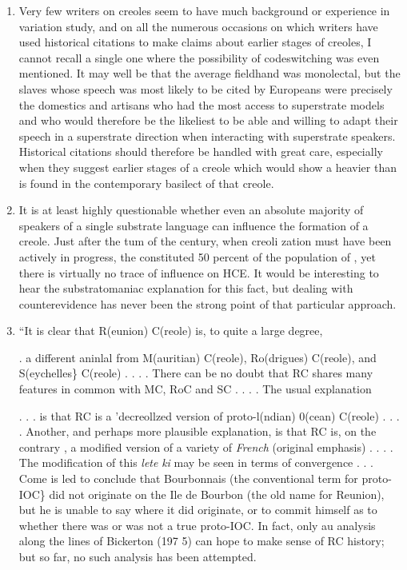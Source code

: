 \begin{enumerate} 
\item Very few writers on creoles seem to have much background or experience in variation study, and on all the numerous occasions on which writers have used historical citations to make claims about earlier stages of creoles, I cannot recall a single one where the possi\-bility of codeswitching was even mentioned. It may well be that the average fieldhand was monolectal, but the slaves whose speech was most likely to be cited by Europeans were precisely the domestics and artisans who had the most access to superstrate models and who would therefore be the likeliest to be able and willing to adapt their speech in a superstrate direction when interacting with superstrate speakers. Historical citations should therefore be handled with great care, especially when they suggest earlier stages of a creole which would show a heavier  than is found in the con\-temporary basilect of that creole.
 
\item It is at least highly questionable whether even an absolute majority of speakers of a single substrate language can influence the formation of a creole. Just after the tum of the century, when creoli zation must have been actively in progress, the  constituted 50 percent of the population of , yet there is virtually no trace of  influence on HCE. It would be interesting to hear the substratomaniac explanation for this fact, but dealing with counter\-evidence has never been the strong point of that particular approach.
\item ``It is clear that R(eunion) C(reole) is, to quite a large degree,


. a different aninlal from M(auritian) C(reole), Ro(drigues) C(reole), and S(eychelles\} C(reole) . . . . There can be no doubt that RC shares many features in common with MC, RoC and SC . . . . The usual explanation

. . . is that RC is a 'decreollzed version of proto-l(ndian) 0(cean) C(reole) . . . . Another, and perhaps more plausible explanation, is that RC is, on the contrary , a modified version of a variety of \textit{French} (original emphasis) . . . . The modification of this \textit{lete} \textit{ki}  may be seen in terms of convergence . . . Come is led to conclude that Bourbonnais (the conventional term for proto-IOC\} did not originate on the Ile de Bourbon (the old name for Reunion), but he is unable
to say where it did originate, or to commit himself as to whether there was or was not a true proto-IOC. In fact, only au analysis along the lines of Bickerton (197 5) can hope to make sense of RC history; but so far, no such analysis has been attempted.


\end{enumerate}
